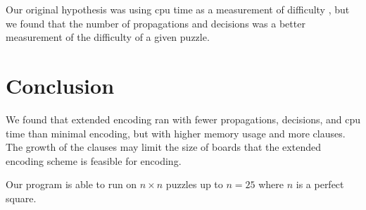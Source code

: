 \documentclass[conference,draftclsnofoot]{IEEEtran}
\begin{document}
Our original hypothesis was using cpu time as a measurement of difficulty , but
we found that the number of propagations and decisions was a better measurement
of the difficulty of a given puzzle.

\section{Conclusion}
We found that extended encoding ran with fewer propagations, decisions, and cpu
time than minimal encoding, but with higher memory usage and more clauses. The
growth of the clauses may limit the size of boards that the extended encoding
scheme is feasible for encoding.

Our program is able to run on $n \times n$ puzzles up to $n = 25$ where $n$ is
a perfect square.




\balance
\end{document}
